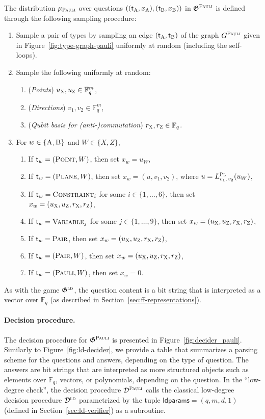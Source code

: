 \documentclass[11pt]{article}
\theoremstyle{definition}
\newcommand{\F}{\ensuremath{\mathbb{F}}}
\newcommand{\ld}{\textsc{ld}}
\newcommand{\game}{\mathfrak{G}}
\newcommand{\decider}{\mathcal{D}}
\newcommand{\gamestyle}[1]{\ensuremath{\textsc{#1}}\xspace}
\newcommand{\pauli}{\gamestyle{Pauli}}
\newcommand{\labelstyle}[1]{\ensuremath{\textsc{#1}}\xspace}
\newcommand{\xpt}{\labelstyle{X}}
\newcommand{\zpt}{\labelstyle{Z}}
\newcommand{\plf}{\labelstyle{Pl}}
\newcommand{\tvarstyle}[1]{\mathsf{#1}}
\newcommand{\tvar}{\ensuremath{\tvarstyle{t}}}
\newcommand{\alice}{\labelstyle{A}}
\newcommand{\bob}{\labelstyle{B}}
\newcommand{\typestyle}[1]{\ensuremath{\textsc{#1}}\xspace}
\newcommand{\Plane}{\typestyle{Plane}}
\newcommand{\Point}{\typestyle{Point}}
\newcommand{\Pair}{\typestyle{Pair}}
\newcommand{\Constraint}{\typestyle{Constraint}}
\newcommand{\Variable}{\typestyle{Variable}}
\newcommand{\Pauli}{\typestyle{Pauli}}
\newcommand{\AB}{\{\alice, \bob\}}
\newcommand{\ldparams}{\mathsf{ldparams}}
\begin{document}
The distribution $\mu_\pauli$ over questions $((\tvar_\alice, x_\alice),
(\tvar_\bob, x_\bob))$ in $\game^\pauli$ is defined through the following
sampling procedure:
\begin{enumerate}
\item Sample a pair of types by sampling an edge $(\tvar_\alice, \tvar_\bob)$ of
  the graph $G^\pauli$ given in Figure~\ref{fig:type-graph-pauli} uniformly at
  random (including the self-loops).
\item Sample the following uniformly at random:
	\begin{enumerate}
	\item (\emph{Points}) $u_\xpt,u_\zpt \in \F_q^m$,
  \item (\emph{Directions}) $v_1, v_2 \in \F_q^m$,
  \item (\emph{Qubit basis for (anti-)commutation}) $r_\xpt,r_\zpt \in \F_q$.
	\end{enumerate}
\item For $w \in \AB$ and $W\in\{X,Z\}$,
	\begin{enumerate}
  \item If $\tvar_w = (\Point, W)$, then set $x_w = u_W$,
  \item If $\tvar_w = (\Plane, W)$, then set $x_w = (u,v_1,v_2)$, where $u =
    L^\plf_{v_1,\, v_2}(u_W)$,
  \item If $\tvar_w = \Constraint_i$ for some $i\in\{1,\ldots,6\}$, then set
    $x_w = (u_\xpt, u_\zpt, r_\xpt, r_\zpt)$,
  \item If $\tvar_w = \Variable_j$ for some $j\in\{1,\ldots,9\}$, then set $x_w
    = (u_\xpt, u_\zpt, r_\xpt, r_\zpt)$,
  \item If $\tvar_w = \Pair$, then set $x_w = (u_\xpt, u_\zpt, r_\xpt, r_\zpt)$,
  \item If $\tvar_w = (\Pair, W)$, then set $x_w = (u_\xpt, u_\zpt, r_\xpt, r_\zpt)$,
  \item If $\tvar_w = (\Pauli, W)$, then set $x_w = 0$.
	\end{enumerate}
\end{enumerate}
As with the game $\game^\ld$, the question content is a bit string that is
interpreted as a vector over $\F_q$ (as described in
Section~\ref{sec:ff-representations}).

\paragraph{Decision procedure.}
The decision procedure for $\game^\pauli$ is presented in
Figure~\ref{fig:decider_pauli}.
Similarly to Figure~\ref{fig:ld-decider}, we provide a table that summarizes a
parsing scheme for the questions and answers, depending on the type of question.
The answers are bit strings that are interpreted as more structured objects such
as elements over $\F_q$, vectors, or polynomials, depending on the question.
In the ``low-degree check'', the decision procedure $\decider^\pauli$ calls the
classical low-degree decision procedure $\decider^\ld$ parametrized by the tuple
$\ldparams = (q,m,d,1)$ (defined in Section~\ref{sec:ld-verifier}) as a
subroutine.
\end{document}

